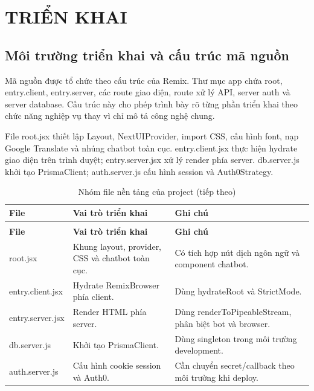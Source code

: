 \chapter{TRIỂN KHAI}

\section{Môi trường triển khai và cấu trúc mã nguồn}

Mã nguồn được tổ chức theo cấu trúc của Remix. Thư mục app chứa root, entry.client, entry.server, các route giao diện, route xử lý API, server auth và server database. Cấu trúc này cho phép trình bày rõ từng phần triển khai theo chức năng nghiệp vụ thay vì chỉ mô tả công nghệ chung.


File root.jsx thiết lập Layout, NextUIProvider, import CSS, cấu hình font, nạp Google Translate và nhúng chatbot toàn cục. entry.client.jsx thực hiện hydrate giao diện trên trình duyệt; entry.server.jsx xử lý render phía server. db.server.js khởi tạo PrismaClient; auth.server.js cấu hình session và Auth0Strategy.


\begingroup
\setlength{\tabcolsep}{3pt}
\renewcommand{\arraystretch}{1.25}
\begin{longtable}{|P{0.220\textwidth}|P{0.330\textwidth}|P{0.370\textwidth}|}
\caption{Nhóm file nền tảng của project}\\
\hline
\textbf{File} & \textbf{Vai trò triển khai} & \textbf{Ghi chú} \\
\hline
\endfirsthead
\caption[]{Nhóm file nền tảng của project (tiếp theo)}\\
\hline
\textbf{File} & \textbf{Vai trò triển khai} & \textbf{Ghi chú} \\
\hline
\endhead
root.jsx & Khung layout, provider, CSS và chatbot toàn cục. & Có tích hợp nút dịch ngôn ngữ và component chatbot. \\
\hline
entry.client.jsx & Hydrate RemixBrowser phía client. & Dùng hydrateRoot và StrictMode. \\
\hline
entry.server.jsx & Render HTML phía server. & Dùng renderToPipeableStream, phân biệt bot và browser. \\
\hline
db.server.js & Khởi tạo PrismaClient. & Dùng singleton trong môi trường development. \\
\hline
auth.server.js & Cấu hình cookie session và Auth0. & Cần chuyển secret/callback theo môi trường khi deploy. \\
\hline
\end{longtable}
\endgroup

